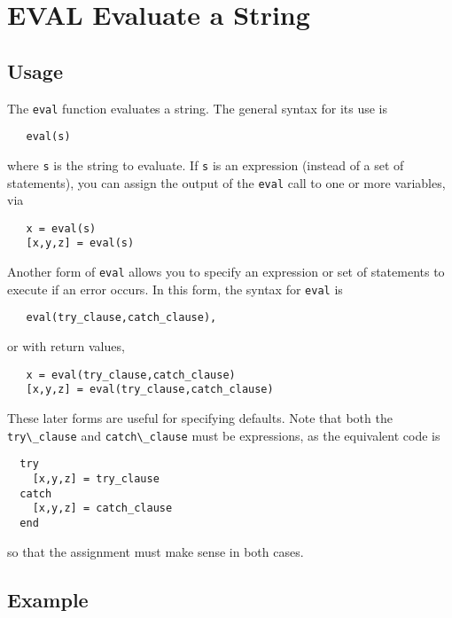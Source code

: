 \section{EVAL Evaluate a String}

\subsection{Usage}

The \verb|eval| function evaluates a string.  The general syntax
for its use is
\begin{verbatim}
   eval(s)
\end{verbatim}
where \verb|s| is the string to evaluate.  If \verb|s| is an expression
(instead of a set of statements), you can assign the output
of the \verb|eval| call to one or more variables, via
\begin{verbatim}
   x = eval(s)
   [x,y,z] = eval(s)
\end{verbatim}

Another form of \verb|eval| allows you to specify an expression or
set of statements to execute if an error occurs.  In this 
form, the syntax for \verb|eval| is
\begin{verbatim}
   eval(try_clause,catch_clause),
\end{verbatim}
or with return values,
\begin{verbatim}
   x = eval(try_clause,catch_clause)
   [x,y,z] = eval(try_clause,catch_clause)
\end{verbatim}
These later forms are useful for specifying defaults.  Note that
both the \verb|try\_clause| and \verb|catch\_clause| must be expressions,
as the equivalent code is
\begin{verbatim}
  try
    [x,y,z] = try_clause
  catch
    [x,y,z] = catch_clause
  end
\end{verbatim}
so that the assignment must make sense in both cases.
\subsection{Example}

